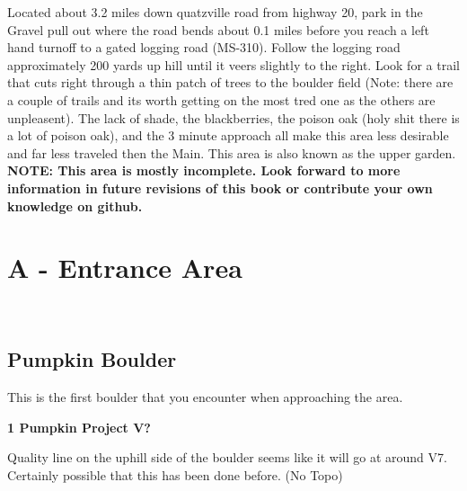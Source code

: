 \raggedcolumns
\begin{multicols}{2}

Located about 3.2 miles down quatzville road from highway 20, park in the Gravel pull out where the road bends about 0.1 miles before you reach a left hand turnoff to a gated logging road (MS-310). Follow the logging road approximately 200 yards up hill until it veers slightly to the right. Look for a trail that cuts right through a thin patch of trees to the boulder field (Note: there are a couple of trails and its worth getting on the most tred one as the others are unpleasent). The lack of shade, the blackberries, the poison oak (holy shit there is a lot of poison oak), and the 3 minute approach all make this area less desirable and far less traveled then the Main. This area is also known as the upper garden.
\newline
\textbf{NOTE: This area is mostly incomplete. Look forward to more information in future revisions of this book or contribute your own knowledge on github.}

\newpage

		\section{A - Entrance Area}\label{sa:Entrance Area}
	\begin{minipage}{\columnwidth}
	\
	\end{minipage}
	
			\begin{minipage}{\columnwidth}
			\subsection*{Pumpkin Boulder}\label{bf:Pumpkin Boulder}
			This is the first boulder that you encounter when approaching the area.
			
			\end{minipage}
			
					\begin{minipage}{\linewidth}	
					\label{rt:Pumpkin Project}
\colorbox{black!20}{
\parbox{0.95\textwidth}{
\textbf{
1 Pumpkin Project V?  
}
}
}

					\begin{adjustwidth}{0.5cm}{}				
					Quality line on the uphill side of the boulder seems like it will go at around V7. Certainly possible that this has been done before.
						\newline (No Topo) 
					\end{adjustwidth}
					\end{minipage}
			\begin{minipage}{\columnwidth}

\end{minipage}
\end{multicols}
